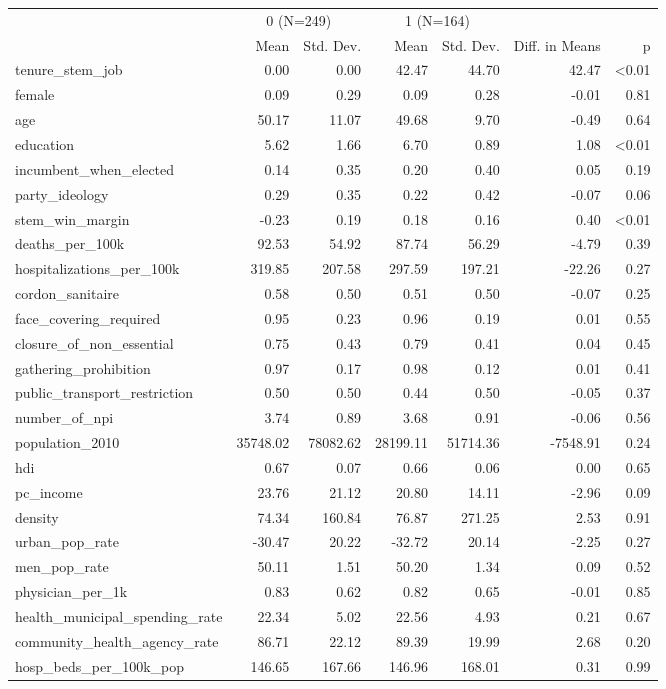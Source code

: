 \begin{table}
\centering
\begin{tabular}[t]{lrrrrrr}
\toprule
\multicolumn{1}{c}{ } & \multicolumn{2}{c}{0 (N=249)} & \multicolumn{2}{c}{1 (N=164)} & \multicolumn{2}{c}{ } \\
\cmidrule(l{3pt}r{3pt}){2-3} \cmidrule(l{3pt}r{3pt}){4-5}
  & Mean & Std. Dev. & Mean & Std. Dev. & Diff. in Means & p\\
\midrule
tenure\_stem\_job & 0.00 & 0.00 & 42.47 & 44.70 & 42.47 & <0.01\\
female & 0.09 & 0.29 & 0.09 & 0.28 & -0.01 & 0.81\\
age & 50.17 & 11.07 & 49.68 & 9.70 & -0.49 & 0.64\\
education & 5.62 & 1.66 & 6.70 & 0.89 & 1.08 & <0.01\\
incumbent\_when\_elected & 0.14 & 0.35 & 0.20 & 0.40 & 0.05 & 0.19\\
party\_ideology & 0.29 & 0.35 & 0.22 & 0.42 & -0.07 & 0.06\\
stem\_win\_margin & -0.23 & 0.19 & 0.18 & 0.16 & 0.40 & <0.01\\
deaths\_per\_100k & 92.53 & 54.92 & 87.74 & 56.29 & -4.79 & 0.39\\
hospitalizations\_per\_100k & 319.85 & 207.58 & 297.59 & 197.21 & -22.26 & 0.27\\
cordon\_sanitaire & 0.58 & 0.50 & 0.51 & 0.50 & -0.07 & 0.25\\
face\_covering\_required & 0.95 & 0.23 & 0.96 & 0.19 & 0.01 & 0.55\\
closure\_of\_non\_essential & 0.75 & 0.43 & 0.79 & 0.41 & 0.04 & 0.45\\
gathering\_prohibition & 0.97 & 0.17 & 0.98 & 0.12 & 0.01 & 0.41\\
public\_transport\_restriction & 0.50 & 0.50 & 0.44 & 0.50 & -0.05 & 0.37\\
number\_of\_npi & 3.74 & 0.89 & 3.68 & 0.91 & -0.06 & 0.56\\
population\_2010 & 35748.02 & 78082.62 & 28199.11 & 51714.36 & -7548.91 & 0.24\\
hdi & 0.67 & 0.07 & 0.66 & 0.06 & 0.00 & 0.65\\
pc\_income & 23.76 & 21.12 & 20.80 & 14.11 & -2.96 & 0.09\\
density & 74.34 & 160.84 & 76.87 & 271.25 & 2.53 & 0.91\\
urban\_pop\_rate & -30.47 & 20.22 & -32.72 & 20.14 & -2.25 & 0.27\\
men\_pop\_rate & 50.11 & 1.51 & 50.20 & 1.34 & 0.09 & 0.52\\
physician\_per\_1k & 0.83 & 0.62 & 0.82 & 0.65 & -0.01 & 0.85\\
health\_municipal\_spending\_rate & 22.34 & 5.02 & 22.56 & 4.93 & 0.21 & 0.67\\
community\_health\_agency\_rate & 86.71 & 22.12 & 89.39 & 19.99 & 2.68 & 0.20\\
hosp\_beds\_per\_100k\_pop & 146.65 & 167.66 & 146.96 & 168.01 & 0.31 & 0.99\\
\bottomrule
\end{tabular}
\end{table}
